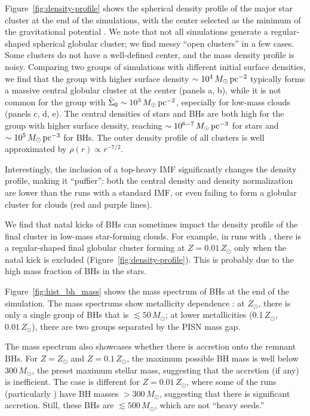 \documentclass[twocolumn]{aastex631}
\begin{document}
Figure~\ref{fig:density-profile} shows the spherical density profile of the major star cluster at the end of the simulations, with the center selected as the minimum of the gravitational potential \citep{GrudicGuszejnovHopkins_2018MNRAS.481..688G}. We note that not all simulations generate a regular-shaped spherical globular cluster; we find messy ``open clusters'' in a few cases. Some clusters do not have a well-defined center, and the mass density profile is noisy. Comparing two groups of simulations with different initial surface densities, we find that the group with higher surface density $\sim 10^4\,M_\odot\,{\rm pc}^{-2}$ typically forms a massive central globular cluster at the center (panels a, b), while it is not common for the group with $\bar\Sigma_0\sim 10^3\,M_\odot\,{\rm pc}^{-2}$, especially for low-mass clouds (panels c, d, e). The central densities of stars and BHs are both high for the group with higher surface density, reaching $\sim 10^{6-7}\,M_\odot\, {\rm pc}^{-3}$ for stars and $\sim 10^5\,M_\odot\, {\rm pc}^{-3}$ for BHs. The outer density profile of all clusters is well approximated by $\rho(r)\propto r^{-7/2}$.

{Interestingly, the inclusion of a top-heavy IMF significantly changes the density profile, making it ``puffier'': both the central density and density normalization are lower than the runs with a standard IMF, or even failing to form a globular cluster for  clouds (red and purple lines). }

We find that natal kicks of BHs can sometimes impact the density profile of the final cluster in low-mass star-forming clouds. For example, in runs with , there is a regular-shaped final globular cluster forming at $Z=0.01\,Z_\odot$ only when the natal kick is excluded (Figure~\ref{fig:density-profile}). This is probably due to the high mass fraction of BHs in the stars.

Figure~\ref{fig:hist_bh_mass} shows the mass spectrum of BHs at the end of the simulation. The mass spectrums show metallicity dependence \citep{CostaShepherdBressan_2025A&A...694A.193C}: at $Z_\odot$, there is only a single group of BHs that is $\lesssim 50\,M_\odot$; at lower metallicities ($0.1\,Z_\odot$, $0.01\,Z_\odot$), there are two groups separated by the PISN mass gap.

The mass spectrum also showcases whether there is accretion onto the remnant BHs. For $Z=Z_\odot$ and $Z=0.1\,Z_\odot$, the maximum possible BH mass is well below $300\,M_\odot$, the preset maximum stellar mass, suggesting that the accretion (if any) is inefficient. The case is different for $Z=0.01\,Z_\odot$, where some of the runs (particularly ) have BH masses $>300\,M_\odot$, suggesting that there is significant accretion. Still, these BHs are $\lesssim 500\,M_\odot$, which are not ``heavy seeds.''
\end{document}
